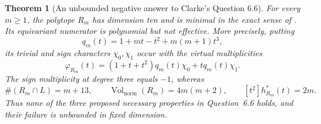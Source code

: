 \documentclass[11pt,a4paper]{article}
\newtheorem{theorem}{Theorem}
\theoremstyle{definition}\newtheorem{definition}[lemma]{Definition}
\theoremstyle{remark}\newtheorem{remark}[lemma]{Remark}
\begin{document}
\begin{theorem}[An unbounded negative answer to Clarke's Question 6.6]
\label{thm:unbounded-minimal}
For every $m\geq1$, the polytope $R_m$ has dimension ten and is minimal
in the exact sense of \cite[Question~6.6]{Clarke26}. Its equivariant
numerator is polynomial but not effective. More precisely, putting
\[
 q_m(t)=1+mt-t^2+m(m+1)t^3,
\]
its trivial and sign characters $\chi_0,\chi_1$ occur with the virtual
multiplicities
\begin{equation}\label{eq:minimal-character}
 \varphi_{R_m}(t)
   =(1+t+t^2)q_m(t)\chi_0+tq_m(t)\chi_1.
\end{equation}
The sign multiplicity at degree three equals $-1$, whereas
\begin{equation}\label{eq:minimal-invariants}
 \#(R_m\cap L)=m+13,\qquad
 \operatorname{Vol}_{\mathrm{norm}}(R_m)=4m(m+2),\qquad
 [t^2]h^*_{R_m}(t)=2m.
\end{equation}
Thus none of the three proposed necessary properties in Question~6.6
holds, and their failure is unbounded in fixed dimension.
\end{theorem}
\end{document}
